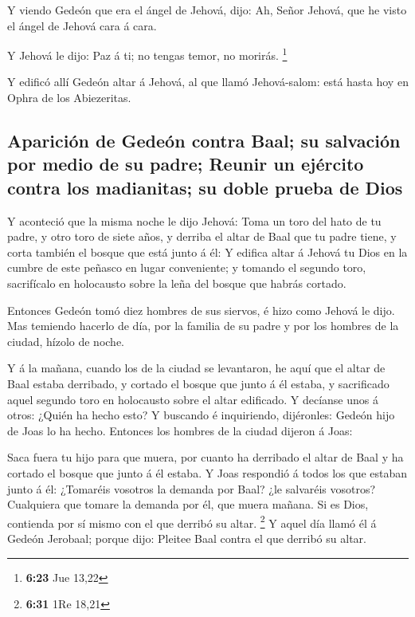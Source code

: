  Y viendo Gedeón que era el ángel de Jehová, dijo: Ah,
Señor Jehová, que he visto el ángel de Jehová cara á cara.

 Y Jehová le dijo: Paz á ti; no tengas temor, no morirás.
\footnote{\textbf{6:23} Jue 13,22}

 Y edificó allí Gedeón altar á Jehová, al que llamó
Jehová-salom: está hasta hoy en Ophra de los Abiezeritas.

\hypertarget{apariciuxf3n-de-gedeuxf3n-contra-baal-su-salvaciuxf3n-por-medio-de-su-padre-reunir-un-ejuxe9rcito-contra-los-madianitas-su-doble-prueba-de-dios}{%
\subsection{Aparición de Gedeón contra Baal; su salvación por medio de
su padre; Reunir un ejército contra los madianitas; su doble prueba de
Dios}\label{apariciuxf3n-de-gedeuxf3n-contra-baal-su-salvaciuxf3n-por-medio-de-su-padre-reunir-un-ejuxe9rcito-contra-los-madianitas-su-doble-prueba-de-dios}}

 Y aconteció que la misma noche le dijo Jehová: Toma un
toro del hato de tu padre, y otro toro de siete años, y derriba el altar
de Baal que tu padre tiene, y corta también el bosque que está junto á
él:  Y edifica altar á Jehová tu Dios en la cumbre de este
peñasco en lugar conveniente; y tomando el segundo toro, sacrifícalo en
holocausto sobre la leña del bosque que habrás cortado.

 Entonces Gedeón tomó diez hombres de sus siervos, é hizo
como Jehová le dijo. Mas temiendo hacerlo de día, por la familia de su
padre y por los hombres de la ciudad, hízolo de noche.

 Y á la mañana, cuando los de la ciudad se levantaron, he
aquí que el altar de Baal estaba derribado, y cortado el bosque que
junto á él estaba, y sacrificado aquel segundo toro en holocausto sobre
el altar edificado.  Y decíanse unos á otros: ¿Quién ha
hecho esto? Y buscando é inquiriendo, dijéronles: Gedeón hijo de Joas lo
ha hecho. Entonces los hombres de la ciudad dijeron á Joas:

 Saca fuera tu hijo para que muera, por cuanto ha derribado
el altar de Baal y ha cortado el bosque que junto á él estaba.
 Y Joas respondió á todos los que estaban junto á él:
¿Tomaréis vosotros la demanda por Baal? ¿le salvaréis vosotros?
Cualquiera que tomare la demanda por él, que muera mañana. Si es Dios,
contienda por sí mismo con el que derribó su altar. \footnote{\textbf{6:31}
  1Re 18,21}  Y aquel día llamó él á Gedeón Jerobaal;
porque dijo: Pleitee Baal contra el que derribó su altar.


